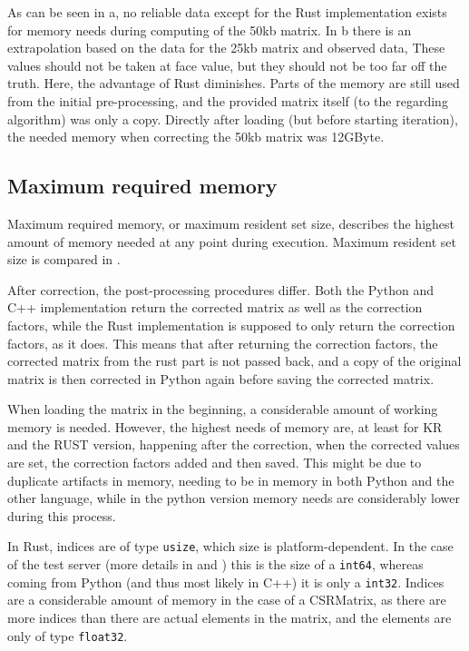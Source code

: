 As can be seen in a, no reliable data except for the Rust
implementation exists for memory needs during computing of the 50kb matrix. In
b there is an extrapolation based on the data for the
25kb matrix and observed data, These values should not be taken at face value,
but they should not be too far off the truth. Here, the advantage of Rust
diminishes. Parts of the memory are still used from the initial pre-processing,
and the provided matrix itself (to the regarding algorithm) was only a copy.
Directly after loading (but before starting iteration), the needed memory when
correcting the 50kb matrix was 12GByte.


\subsection{Maximum required memory}\label{sec:maxmem}



Maximum required memory, or maximum resident set size, describes the highest
amount of memory needed at any point during execution. Maximum resident set size
is compared in .

After correction, the post-processing procedures differ. Both the Python and
C++ implementation return the corrected matrix as well as the correction
factors, while the Rust implementation is supposed to only return the
correction factors, as it does. This means that after returning the correction
factors, the corrected matrix from the rust part is not passed back, and a copy
of the original matrix is then corrected in Python again before saving the
corrected matrix.

When loading the matrix in the beginning, a considerable amount of working
memory is needed. However, the highest needs of memory are, at least for KR and
the RUST version, happening after the correction, when the corrected values are
set, the correction factors added and then saved. This might be due to
duplicate artifacts in memory, needing to be in memory in both Python and
the other language, while in the python version memory needs are considerably
lower during this process.

In Rust, indices are of type \verb|usize|, which size is platform-dependent. In
the case of the test server (more details in  and
) this is the size of a \verb|int64|, whereas coming from
Python (and thus most likely in C++) it is only a \verb|int32|. Indices are a
considerable amount of memory in the case of a CSRMatrix, as there are more
indices than there are actual elements in the matrix, and the elements are only
of type \verb|float32|.

